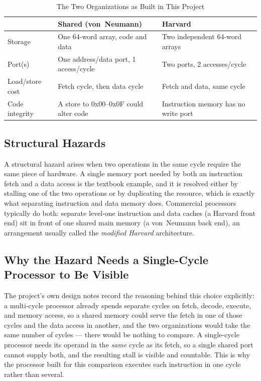 \documentclass[conference]{IEEEtran}
\begin{document}
\begin{table}[t]
\centering
\caption{The Two Organizations as Built in This Project}
\label{tab:orgs}
\footnotesize
\begin{tabularx}{\columnwidth}{@{}l X X@{}}
\toprule
 & \textbf{Shared (von~Neumann)} & \textbf{Harvard} \\
\midrule
Storage & One 64-word array, code and data & Two independent 64-word arrays \\
Port(s) & One address/data port, 1 access/cycle & Two ports, 2 accesses/cycle \\
Load/store cost & Fetch cycle, then data cycle & Fetch and data, same cycle \\
Code integrity & A store to 0x00--0x0F could alter code & Instruction memory has no write port \\
\bottomrule
\end{tabularx}
\end{table}

\subsection{Structural Hazards}
A structural hazard arises when two operations in the same cycle require the same piece of
hardware. A single memory port needed by both an instruction fetch and a data access is the
textbook example, and it is resolved either by stalling one of the two operations or by
duplicating the resource, which is exactly what separating instruction and data memory does.
Commercial processors typically do both: separate level-one instruction and data caches (a
Harvard front end) sit in front of one shared main memory (a von~Neumann back end), an arrangement
usually called the \emph{modified Harvard} architecture.

\subsection{Why the Hazard Needs a Single-Cycle Processor to Be Visible}
The project's own design notes record the reasoning behind this choice explicitly: a multi-cycle
processor already spends separate cycles on fetch, decode, execute, and memory access, so a shared
memory could serve the fetch in one of those cycles and the data access in another, and the two
organizations would take the same number of cycles --- there would be nothing to compare. A
single-cycle processor needs its operand in the \emph{same} cycle as its fetch, so a single
shared port cannot supply both, and the resulting stall is visible and countable. This is why the
processor built for this comparison executes each instruction in one cycle rather than several.
\end{document}
